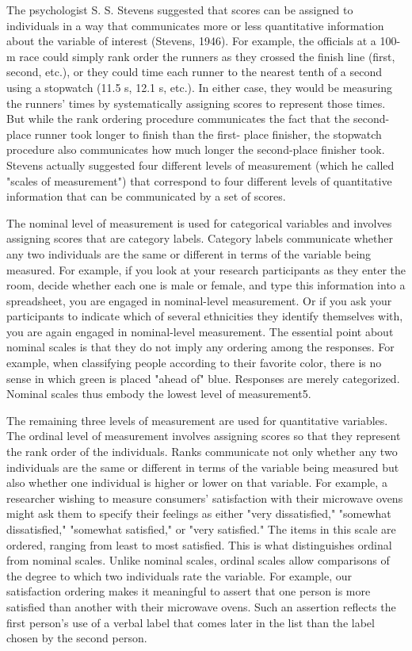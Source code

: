 The psychologist S. S. Stevens suggested that scores can be assigned to individuals in a way that communicates more or less quantitative information about the variable of interest (Stevens, 1946). For example, the officials at a 100-m race could simply rank order the runners as they crossed the finish line (first, second, etc.), or they could time each runner to the nearest tenth of a second using a stopwatch (11.5 s, 12.1 s, etc.). In either case, they would be measuring the runners' times by systematically assigning scores to represent those times. But while the rank ordering procedure communicates the fact that the second-place runner took longer to finish than the first- place finisher, the stopwatch procedure also communicates how much longer the second-place finisher took. Stevens actually suggested four different levels of measurement (which he called "scales of measurement") that correspond to four different levels of quantitative information that can be communicated by a set of scores.

The nominal level of measurement is used for categorical variables and involves assigning scores that are category labels. Category labels communicate whether any two individuals are the same or different in terms of the variable being measured. For example, if you look at your research participants as they enter the room, decide whether each one is male or female, and type this information into a spreadsheet, you are engaged in nominal-level measurement. Or if you ask your participants to indicate which of several ethnicities they identify themselves with, you are again engaged in nominal-level measurement. The essential point about nominal scales is that they do not imply any ordering among the responses. For example, when classifying people according to their favorite color, there is no sense in which green is placed "ahead of" blue. Responses are merely categorized. Nominal scales thus embody the lowest level of measurement5.

The remaining three levels of measurement are used for quantitative variables. The ordinal level of measurement involves assigning scores so that they represent the rank order of the individuals. Ranks communicate not only whether any two individuals are the same or different in terms of the variable being measured but also whether one individual is higher or lower on that variable. For example, a researcher wishing to measure consumers' satisfaction with their microwave ovens might ask them to specify their feelings as either "very dissatisfied," "somewhat dissatisfied," "somewhat satisfied," or "very satisfied." The items in this scale are ordered, ranging from least to most satisfied. This is what distinguishes ordinal from nominal scales. Unlike nominal scales, ordinal scales allow comparisons of the degree to which two individuals rate the variable. For example, our satisfaction ordering makes it meaningful to assert that one person is more satisfied than another with their microwave ovens. Such an assertion reflects the first person's use of a verbal label that comes later in the list than the label chosen by the second person.

